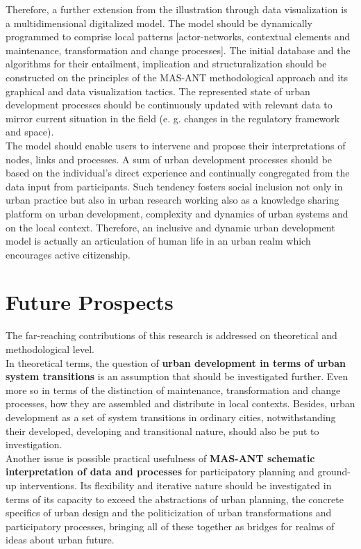 \documentclass[11pt]{report}
\begin{document}
{Therefore, a further extension from the illustration through data visualization is a multidimensional digitalized model.
The model should be dynamically programmed to comprise local patterns [actor-networks, contextual elements and maintenance, transformation and change processes].
The initial database and the algorithms for their entailment, implication and structuralization should be constructed on the principles of the MAS-ANT methodological approach and its graphical and data visualization tactics.
The represented state of urban development processes should be continuously updated with relevant data to mirror current situation in the field (e. g. changes in the regulatory framework and space).
\\

The model should enable users to intervene and propose their interpretations of nodes, links and processes.
A sum of urban development processes should be based on the individual's direct experience and continually congregated from the data input from participants.
Such tendency fosters social inclusion not only in urban practice but also in urban research working also as a knowledge sharing platform on urban development, complexity and dynamics of urban systems and on the local context.
Therefore, an inclusive and dynamic urban development model is actually an articulation of human life in an urban realm which encourages active citizenship.

\section{Future Prospects}

The far-reaching contributions of this research is addressed on theoretical and methodological level. 
\\
In theoretical terms, the question of \textbf{urban development in terms of urban system transitions} is an assumption that should be investigated further. Even more so in terms of the distinction of maintenance, transformation and change processes, how they are assembled and distribute in local contexts.
Besides, urban development as a set of system transitions in ordinary cities, notwithstanding their developed, developing and transitional nature, should also be put to investigation. 
\\

Another issue is possible practical usefulness of \textbf{MAS-ANT schematic interpretation of data and processes} for participatory planning and ground-up interventions.
Its flexibility and iterative nature should be investigated in terms of its capacity to exceed the abstractions of urban planning, the concrete specifics of urban design and the politicization of urban transformations and participatory processes, bringing all of these together as bridges for realms of ideas about urban future.
\\

}
\end{document}
